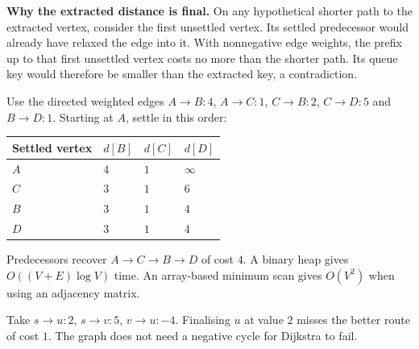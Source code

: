 \documentclass[12pt,a4paper]{article}
\begin{document}
\textbf{Why the extracted distance is final.} On any hypothetical shorter path to the extracted vertex, consider the first unsettled vertex. Its settled predecessor would already have relaxed the edge into it. With nonnegative edge weights, the prefix up to that first unsettled vertex costs no more than the shorter path. Its queue key would therefore be smaller than the extracted key, a contradiction.
\begin{tcolorbox}[examplebox, title={Dijkstra trace}]
Use the directed weighted edges $A\to B:4$, $A\to C:1$, $C\to B:2$, $C\to D:5$ and $B\to D:1$. Starting at $A$, settle in this order:
\par\vspace{5pt}
\begingroup
\setlength{\extrarowheight}{1pt}
\noindent\begin{tabularx}{\linewidth}{|B{2.4cm}|Y|Y|Y|}
\hline
\textbf{Settled vertex} & \textbf{$d[B]$} & \textbf{$d[C]$} & \textbf{$d[D]$} \\ \hline
$A$ & $4$ & $1$ & $\infty$ \\ \hline
$C$ & $3$ & $1$ & $6$ \\ \hline
$B$ & $3$ & $1$ & $4$ \\ \hline
$D$ & $3$ & $1$ & $4$ \\ \hline
\end{tabularx}\par
\endgroup
Predecessors recover $A\to C\to B\to D$ of cost $4$. A binary heap gives $O((V+E)\log V)$ time. An array-based minimum scan gives $O(V^2)$ when using an adjacency matrix.
\end{tcolorbox}

\begin{tcolorbox}[masonbox, title={Dijkstra requires nonnegative weights}]
Take $s\to u:2$, $s\to v:5$, $v\to u:-4$. Finalising $u$ at value $2$ misses the better route of cost $1$. The graph does not need a negative cycle for Dijkstra to fail.
\end{tcolorbox}
\end{document}
